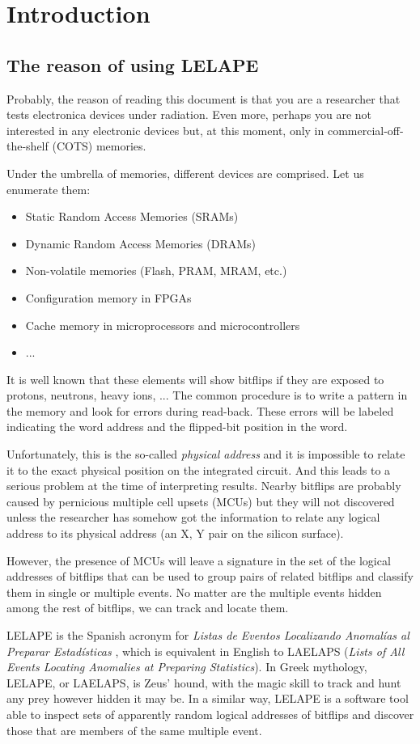 \chapter{Introduction}
%
\section{The reason of using LELAPE}
Probably, the reason of reading this document is that you are a researcher that tests electronica devices under radiation. Even more, perhaps you are not interested in any electronic devices but, at this moment, only in commercial-off-the-shelf (COTS) memories. 

Under the umbrella of memories, different devices are comprised. Let us enumerate them:
%
\begin{itemize}
	\item Static Random Access Memories (SRAMs)
	\item Dynamic Random Access Memories (DRAMs)
	\item Non-volatile memories (Flash, PRAM, MRAM, etc.)
	\item Configuration memory in FPGAs
	\item Cache memory in microprocessors and microcontrollers
	\item ...
\end{itemize}
%
It is well known that these elements will show bitflips if they are exposed to protons, neutrons, heavy ions, ... The common procedure is to write a pattern in the memory and look for errors during read-back. These errors will be labeled indicating the word address and the flipped-bit position in the word. 

Unfortunately, this is the so-called \textit{physical address} and it is impossible to relate it to the exact physical position on the integrated circuit. And this leads to a serious problem at the time of interpreting results. Nearby bitflips are probably caused by pernicious multiple cell upsets (MCUs) but they will not discovered unless the researcher has somehow got the information to relate any logical address to its physical address (an X, Y pair on the silicon surface).

However, the presence of MCUs will leave a signature in the set of the logical addresses of bitflips that can be used to group pairs of related bitflips and classify them in single or multiple events. No matter are the multiple events hidden among the rest of bitflips, we can track and locate them.

LELAPE is the Spanish acronym for \textit{Listas de Eventos Localizando Anomalías al Preparar Estadísticas }, which is equivalent in English to LAELAPS (\textit{Lists of All Events Locating Anomalies at Preparing Statistics}). In Greek mythology, LELAPE, or LAELAPS, is Zeus' hound, with the magic skill to track and hunt any prey however hidden it may be. In a similar way, LELAPE is a software tool able to inspect sets of apparently random logical addresses of bitflips and discover those that are members of the same multiple event.

